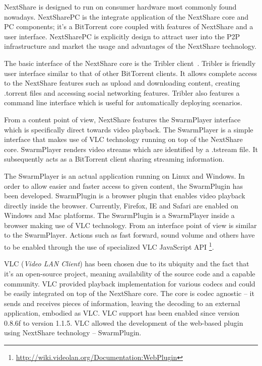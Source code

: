 NextShare is designed to run on consumer hardware most commonly found
nowadays. NextSharePC is the integrate application of the NextShare core and
PC components; it's a BitTorrent core coupled with features of NextShare and a
user interface. NextSharePC is explicitly design to attract user into the
P2P infrastructure and market the usage and advantages of the NextShare
technology.

The basic interface of the NextShare core is the Tribler
client~\cite{tribler-social}. Tribler is friendly user interface similar to
that of other BitTorrent clients. It allows complete access to the NextShare
features such as upload and downloading content, creating .torrent files and
accessing social networking features. Tribler also features a command line
interface which is useful for automatically deploying scenarios.

From a content point of view, NextShare features the SwarmPlayer interface
which is specifically direct towards video playback. The SwarmPlayer is a
simple interface that makes use of VLC technology running on top of the
NextShare core. SwarmPlayer renders video streams which are identified by a
.tstream file. It subsequently acts as a BitTorrent client sharing streaming
information.

The SwarmPlayer is an actual application running on Linux and Windows. In
order to allow easier and faster access to given content, the SwarmPlugin has
been developed. SwarmPlugin is a browser plugin that enables video playback
directly inside the browser. Currently, Firefox, IE and Safari are enabled on
Windows and Mac platforms. The SwarmPlugin is a SwarmPlayer inside a browser
making use of VLC technology. From an interface point of view is similar to
the SwarmPlayer. Actions such as fast forward, sound volume and others have to
be enabled through the use of specialized VLC JavaScript API
\footnote{\url{http://wiki.videolan.org/Documentation:WebPlugin}}.

VLC (\textit{Video LAN Client}) has been chosen due to its ubiquity and the fact that it's an open-source
project, meaning availability of the source code and a capable community. VLC
provided playback implementation for various codecs and could be easily
integrated on top of the NextShare core. The core is codec agnostic -- it
sends and receives pieces of information, leaving the decoding to an external
application, embodied as VLC. VLC support has been enabled since version
0.8.6f to version 1.1.5. VLC allowed the development of the web-based
plugin using NextShare technology -- SwarmPlugin.


